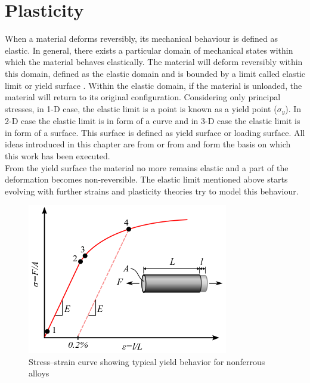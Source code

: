 \chapter{Plasticity}


When a material deforms reversibly, its mechanical behaviour is defined as elastic. In general, there exists a particular domain of mechanical states within which the material behaves elastically. The material will deform reversibly within this domain, defined as the elastic domain and is bounded by a limit called elastic limit or yield surface \cite{simo}. Within the elastic domain, if the material is unloaded, the material will return to its original configuration. Considering only principal stresses, in 1-D case, the elastic limit is a point is known as a yield point ($\sigma_y $). In 2-D case the elastic limit is in form of  a curve and in 3-D case the elastic limit is in form of a surface. This surface is defined as yield surface\cite{borja} or loading surface\cite{simo}.
All ideas introduced in this chapter are from \cite{borja} or from \cite{simo} and form the basis on which this work has been executed.\\ 

From the yield surface the material no more remains elastic and a part of the deformation becomes non-reversible. The elastic limit mentioned above starts evolving with further strains and plasticity theories try to model this behaviour.

\begin{figure}
	\includegraphics[width=.8\textwidth]{pics/Metal_yield.png}
	\caption{Stress–strain curve showing typical yield behavior for nonferrous alloys\cite{wiki_plas_1d}}
	\label{fig:Plas_1D}
\end{figure}

